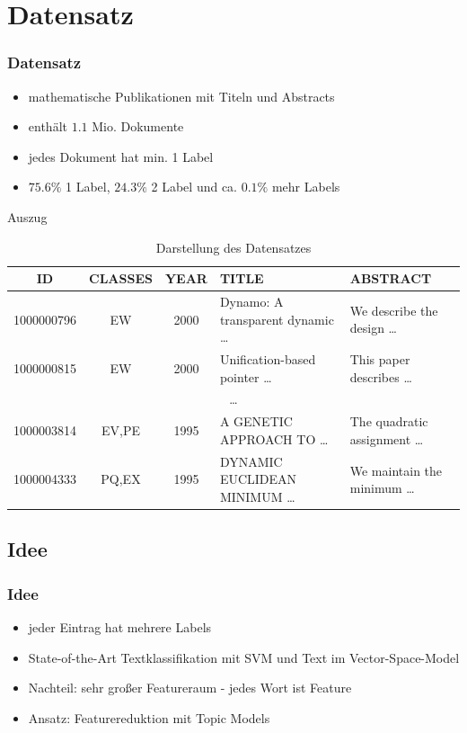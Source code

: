 \documentclass[12pt, xcolor=table]{beamer}
\begin{document}
\section{Datensatz}
\begin{frame}
    \frametitle{Datensatz}
    \begin{itemize}
        \item mathematische Publikationen mit Titeln und Abstracts
        \item enthält  $1.1$ Mio. Dokumente
        \item jedes Dokument hat min. 1 Label
        \item $75.6 \%$ 1 Label, $24.3 \%$ 2 Label und ca. $0.1 \%$ mehr Labels
    \end{itemize}
    \begin{block}{Auszug}
        \begin{table}
            \begin{tabular}{cccll}
                \tiny\textbf{ID} &\tiny \textbf{CLASSES} &\tiny \textbf{YEAR} &\tiny \textbf{TITLE} & \tiny \textbf{ABSTRACT} \\
                \hline
                \tiny 1000000796 &\tiny EW & \tiny 2000 & \tiny Dynamo: A transparent dynamic \dots  & \tiny We describe the design \dots \\
                \tiny 1000000815 &\tiny EW & \tiny 2000 & \tiny Unification-based pointer \dots  & \tiny This paper describes \dots \\
                \multicolumn{5}{c}{\dots} \\
                \tiny 1000003814 &\tiny EV,PE & \tiny 1995 & \tiny A GENETIC APPROACH TO \dots  & \tiny The quadratic assignment \dots \\
                \tiny 1000004333 & \tiny PQ,EX &\tiny 1995 &\tiny DYNAMIC EUCLIDEAN MINIMUM \dots & \tiny We maintain the minimum \dots \\
            \end{tabular}
             \caption*{Darstellung des Datensatzes}
        \end{table}
    \end{block}
\end{frame}

\subsection{Idee} %
\begin{frame}
     \frametitle{Idee}
     \begin{itemize}
         \item jeder Eintrag hat mehrere Labels
         \item State-of-the-Art Textklassifikation mit SVM und Text im Vector-Space-Model
         \item Nachteil: sehr großer Featureraum - jedes Wort ist Feature
         \item Ansatz: Featurereduktion mit Topic Models
     \end{itemize}
\end{frame}
\end{document}

